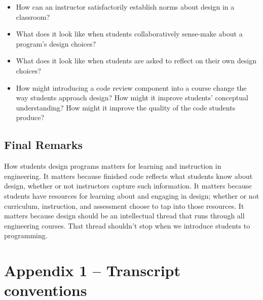 \begin{itemize}
\item
  How can an instructor satisfactorily establish norms about design in a
  classroom?
\item
  What does it look like when students collaboratively sense-make about
  a program's design choices?
\item
  What does it look like when students are asked to reflect on their own
  design choices?
\item
  How might introducing a code review component into a course change the
  way students approach design? How might it improve students'
  conceptual understanding? How might it improve the quality of the code
  students produce?
\end{itemize}

\subsection{Final Remarks}\label{final-remarks}

How students design programs matters for learning and instruction in
engineering. It matters because finished code reflects what students
know about design, whether or not instructors capture such information.
It matters because students have resources for learning about and
engaging in design; whether or not curriculum, instruction, and
assessment choose to tap into those resources. It matters because design
should be an intellectual thread that runs through all engineering
courses. That thread shouldn't stop when we introduce students to
programming.

\section{Appendix 1 -- Transcript
conventions}\label{appendix-1-transcript-conventions}

